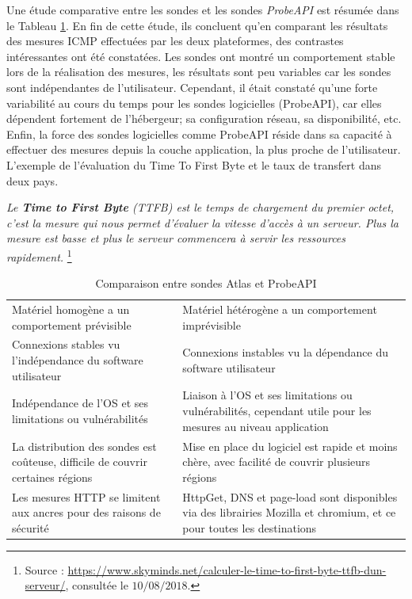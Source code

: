 Une étude comparative \cite{COMPARE-ATLAS-PROBEAPI}  entre les sondes   et les sondes \textit{ProbeAPI} est résumée dans le Tableau \ref{tab:compare-ripeatlas-probapi}. 
En fin de cette étude, ils concluent qu'en comparant les résultats des mesures ICMP effectuées par les deux plateformes, des contrastes intéressantes ont été constatées.  Les sondes  ont montré un comportement stable lors de la réalisation  des mesures, les résultats sont peu variables car les sondes sont indépendantes de l'utilisateur. Cependant, il était constaté qu'une forte variabilité au cours du temps pour les sondes logicielles (ProbeAPI), car elles dépendent fortement de l'hébergeur; sa configuration réseau, sa disponibilité, etc.
Enfin, la force des sondes logicielles comme  ProbeAPI réside dans sa capacité  à effectuer des mesures depuis la couche application, la plus proche de l'utilisateur. L'exemple de l'évaluation du Time To First Byte et le taux de transfert dans deux pays.
\begin{tcolorbox}
	\og \textit{	Le \textbf{Time to First Byte} (TTFB) est le temps de chargement du premier octet, c'est la mesure qui nous permet d'évaluer la vitesse d'accès à un serveur. Plus la mesure est basse et plus le serveur commencera à servir les ressources rapidement.} \fg{} \footnote{Source : \url{https://www.skyminds.net/calculer-le-time-to-first-byte-ttfb-dun-serveur/}, consultée le $10/08/2018$.}
\end{tcolorbox}

\begin{table}[h]
	\centering
	\begin{adjustbox}{max width=\textwidth}
		\begin{tabularx}{\textwidth}{|X|X|}
			\hline
			\thead{Sonde Atlas}& \thead{ProbeAPI} \\ \hline
			Matériel homogène a un comportement  prévisible&  Matériel hétérogène a un  comportement imprévisible \\ \hline
			Connexions stables vu l'indépendance du software utilisateur& Connexions instables vu la dépendance du software utilisateur\\ \hline
			Indépendance  de l'OS et ses limitations ou vulnérabilités&  Liaison à l'OS et ses limitations ou vulnérabilités, cependant utile pour les mesures au niveau application \\ \hline
			La distribution des sondes est coûteuse, difficile de couvrir certaines régions&  Mise en place du logiciel est rapide et moins chère, avec facilité de couvrir plusieurs régions\\ \hline
			Les mesures HTTP se limitent aux ancres	pour des raisons de sécurité& HttpGet, DNS et page-load sont disponibles via des librairies Mozilla et chromium, et ce pour toutes les destinations \\ \hline
			
		\end{tabularx}
	\end{adjustbox}
	\caption{Comparaison entre sondes  Atlas et ProbeAPI}
	\label{tab:compare-ripeatlas-probapi}
\end{table}

